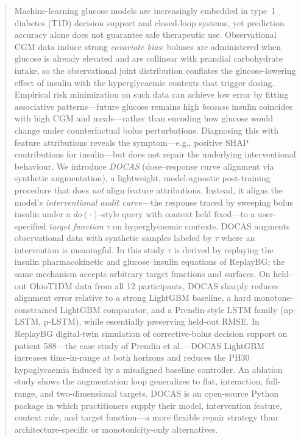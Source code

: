 \documentclass[a4paper,fleqn]{cas-sc}
\begin{document}
\begin{abstract}
Machine-learning glucose models are increasingly embedded in type~1
diabetes (T1D) decision support and closed-loop systems, yet prediction
accuracy alone does not guarantee safe therapeutic use. Observational CGM data
induce strong \emph{covariate bias}: boluses are administered when glucose is
already elevated and are collinear with prandial carbohydrate intake, so the
observational joint distribution conflates the glucose-lowering effect of
insulin with the hyperglycaemic contexts that trigger dosing. Empirical risk
minimization on such data can achieve low error by fitting associative
patterns---future glucose remains high \emph{because} insulin coincides with
high CGM and meals---rather than encoding how glucose would change under
counterfactual bolus perturbations. Diagnosing this with feature attributions
reveals the symptom---e.g., positive SHAP contributions for insulin---but does
not repair the underlying interventional behaviour. We introduce \emph{DOCAS}
(dose--response curve alignment via synthetic augmentation), a lightweight,
model-agnostic post-training procedure that does \emph{not} align feature
attributions. Instead, it aligns the model's \emph{interventional audit
curve}---the response traced by sweeping bolus insulin under a $do(\cdot)$-style
query with context held fixed---to a user-specified \emph{target function}
$\tau$ on hyperglycaemic contexts. DOCAS augments observational data with
synthetic samples labeled by $\tau$ where an intervention is meaningful. In
this study $\tau$ is derived by replaying the insulin pharmacokinetic and
glucose--insulin equations of ReplayBG; the same mechanism accepts arbitrary target functions and
surfaces. On held-out OhioT1DM data from all 12 participants, DOCAS sharply
reduces alignment error relative to a strong LightGBM baseline, a hard
monotone-constrained LightGBM comparator, and a Prendin-style LSTM family
(np-LSTM, p-LSTM), while essentially preserving held-out RMSE. In ReplayBG
digital-twin simulation of corrective-bolus decision support on patient
588---the case study of Prendin et al.---DOCAS LightGBM increases
time-in-range at both horizons and reduces the PH30 hypoglycaemia induced by a
misaligned baseline controller. An ablation study shows the augmentation loop
generalizes to flat, interaction, full-range, and two-dimensional targets.
DOCAS is an open-source Python package in which practitioners supply their
model, intervention feature, context rule, and target function---a more
flexible repair strategy than architecture-specific or monotonicity-only
alternatives.
\end{abstract}
\end{document}
